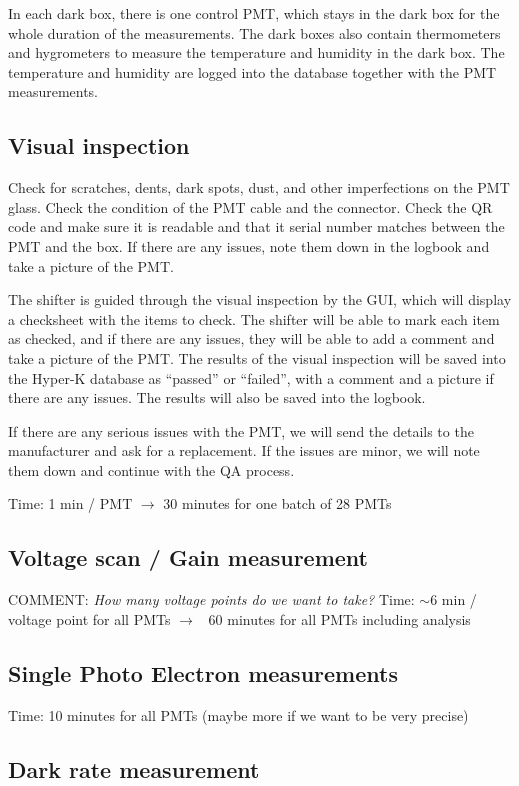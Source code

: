 \documentclass[12pt,a4paper]{article}
\newcommand{\note}[1]{\textcolor{green!70!black}{COMMENT: \textit{#1}}}
\begin{document}
In each dark box, there is one control PMT, which stays in the dark box for the whole duration of the measurements. The dark boxes also contain thermometers and hygrometers to measure the temperature and humidity in the dark box. The temperature and humidity are logged into the database together with the PMT measurements.

\subsection{Visual inspection}
Check for scratches, dents, dark spots, dust, and other imperfections on the PMT glass. Check the condition of the PMT cable and the connector. Check the QR code and make sure it is readable and that it serial number matches between the PMT and the box. If there are any issues, note them down in the logbook and take a picture of the PMT.

The shifter is guided through the visual inspection by the GUI, which will display a checksheet with the items to check. The shifter will be able to mark each item as checked, and if there are any issues, they will be able to add a comment and take a picture of the PMT. The results of the visual inspection will be saved into the Hyper-K database as ``passed'' or ``failed'', with a comment and a picture if there are any issues. The results will also be saved into the logbook.

If there are any serious issues with the PMT, we will send the details to the manufacturer and ask for a replacement. If the issues are minor, we will note them down and continue with the QA process.

Time: 1 min / PMT $\rightarrow$ 30 minutes for one batch of 28 PMTs

\subsection{Voltage scan / Gain measurement}
\note{How many voltage points do we want to take?}
Time: $\sim$6 min / voltage point for all PMTs $\rightarrow$ ~60 minutes for all PMTs including analysis

\subsection{Single Photo Electron measurements}

Time: 10 minutes for all PMTs (maybe more if we want to be very precise)

\subsection{Dark rate measurement}
\end{document}
